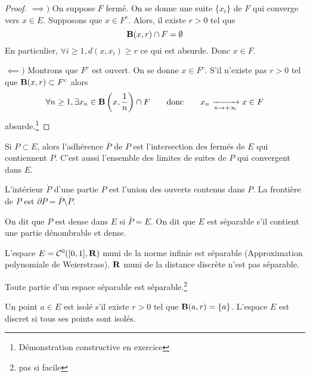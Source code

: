 \begin{proof}
    $\implies )$ On suppose $F$ fermé. On se donne une suite  $\{x_i\}$ de  $F$ qui converge vers  $x \in E$. Supposons que $x \in F^c$. Alors, il existe $r>0$ tel que  \[
        \mathbf B(x, r)\cap F=\emptyset
    \]
    En particulier, $\forall  i \geq 1, d(x, x_i)\geq r$ ce qui est absurde. Donc $x \in  F$.

    $\impliedby )$ Montrons que  $F^c$ est ouvert. On se donne  $x \in  F^c$. S'il n'existe pas $r>0$ tel que  $\mathbf B(x, r)\subset F^c$ alors \[
        \forall  n\geq 1, \exists x_n \in  \mathbf B\left(x, \frac{1}{n}\right)\cap F \qquad  \text{donc} \qquad  x_n\xrightarrow[n\to +\infty]{}x \in F
    \]
    absurde.\footnote{Démonstration constructive en exercice}
\end{proof}

\begin{dfn}
    Si $P \subset E$, alors l'adhérence  $\bar P$ de  $P$ est l'intersection des fermés de  $E $ qui contiennent $P$.
    C'est aussi\footnotemark{} l'ensemble des limites de suites de $P$ qui convergent dans  $E$.

    L'intérieur $\mathring P$ d'une partie $P$ est l'union des ouverts contenus dans $P$. La frontière de $P$ est  $\partial P=\bar P\setminus \mathring P$.
\end{dfn}


\begin{dfn}
    On dit que $P$ est dense dans  $E$ si $\bar P=E$. On dit que $E$ est séparable s'il contient une partie dénombrable et dense.
\end{dfn}

\begin{ex}
    L'espace $E=\mathcal  C^0([0,1], \mathbf R)$ muni de la norme infinie est séparable (Approximation polynomiale de Weierstrass). $\mathbf R$ muni de la distance discrète n'est pas séparable.
\end{ex}

\begin{rem}
    Toute partie d'un espace séparable est séparable.\footnote{pas si facile}
\end{rem}

\begin{dfn}
    Un point $a \in  E$ est isolé s'il existe $r>0$ tel que  $\mathbf B(a, r)=\{a\}$. L'espace $E$ est discret si tous ses points sont isolés.
\end{dfn}

